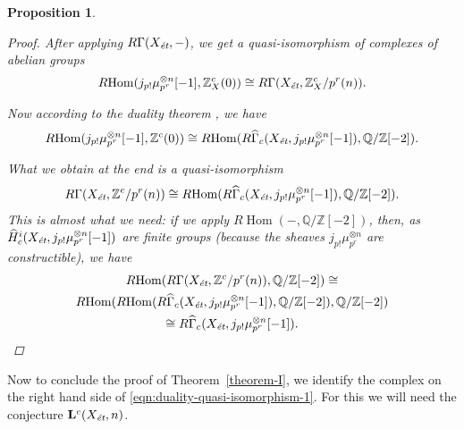 \documentclass[draft,leqno,12pt]{article}
\theoremstyle{plain}
\newtheorem{proposition}[theorem]{\indent\sc Proposition}
\theoremstyle{definition}
\DeclareMathOperator{\Hom}{Hom}
\newcommand{\ZZ}{\mathbb{Z}}
\newcommand{\QQ}{\mathbb{Q}}
\newcommand{\et}{\text{\it \'{e}t}}
\newcommand{\RHom}{R\!\Hom}
\begin{document}
\begin{proposition}
\begin{proof}
    After applying $R\Gamma (X_\et, -)$, we get a quasi-isomorphism of
    complexes of abelian groups
    \begin{equation}
      \RHom (j_{p!} \mu_{p^r}^{\otimes n} [-1], \ZZ^c_X (0)) \cong
      R\Gamma (X_\et, \ZZ^c_X/p^r (n)).
    \end{equation}

    Now according to the duality theorem \cite[Theorem 7.8]{Geisser-2010},
    we have
    \begin{equation}
      \RHom (j_{p !} \mu_{p^r}^{\otimes n} [-1], \ZZ^c (0)) \cong
      \RHom (R\widehat{\Gamma}_c (X_\et, j_{p !} \mu_{p^r}^{\otimes n} [-1]), \QQ/\ZZ [-2]).
    \end{equation}

    What we obtain at the end is a quasi-isomorphism
    \[ R\Gamma (X_\et, \ZZ^c/p^r (n)) \cong
    \RHom (R\widehat{\Gamma}_c (X_\et, j_{p !} \mu_{p^r}^{\otimes n} [-1]), \QQ/\ZZ [-2]). \]
    This is almost what we need: if we apply $\RHom (-,\QQ/\ZZ [-2])$, then, as
    $\widehat{H}^i_c (X_\et, j_{p!} \mu_{p^r}^{\otimes n} [-1])$ are
    finite groups (because the sheaves $j_{p!} \mu_{p^r}^{\otimes n}$ are
    constructible), we have
    \begin{multline*}
      \RHom (R\Gamma (X_\et, \ZZ^c/p^r (n)), \QQ/\ZZ[-2]) \cong\\
      \RHom (\RHom (R\widehat{\Gamma}_c (X_\et, j_{p !} \mu_{p^r}^{\otimes n} [-1]), \QQ/\ZZ[-2]), \QQ/\ZZ[-2]) \\
      \cong R\widehat{\Gamma}_c (X_\et, j_{p !} \mu_{p^r}^{\otimes n} [-1]). \qedhere
    \end{multline*}
  \end{proof}
\end{proposition}

Now to conclude the proof of Theorem~\ref{theorem-I}, we identify the complex
on the right hand side of \eqref{eqn:duality-quasi-isomorphism-1}. For this we
will need the conjecture $\mathbf{L}^c (X_\et, n)$.
\end{document}
